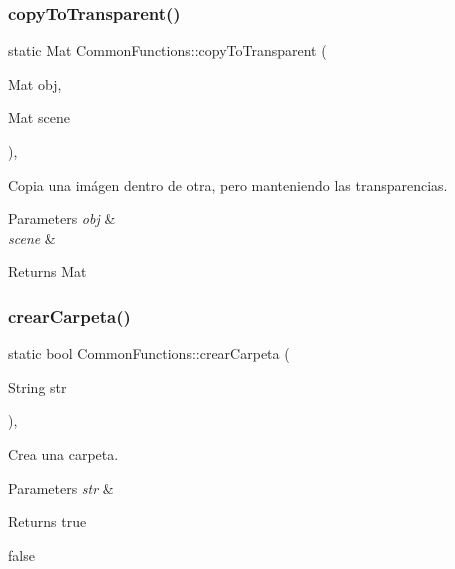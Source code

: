 \subsubsection{\texorpdfstring{copy\+To\+Transparent()}{copyToTransparent()}}
{\footnotesize\ttfamily static Mat Common\+Functions\+::copy\+To\+Transparent (\begin{DoxyParamCaption}\item[{Mat}]{obj,  }\item[{Mat}]{scene }\end{DoxyParamCaption})\hspace{0.3cm}{\ttfamily [inline]}, {\ttfamily [static]}}



Copia una imágen dentro de otra, pero manteniendo las transparencias. 


\begin{DoxyParams}{Parameters}
{\em obj} & \\
\hline
{\em scene} & \\
\hline
\end{DoxyParams}
\begin{DoxyReturn}{Returns}
Mat 
\end{DoxyReturn}
\mbox{\label{classCommonFunctions_acb8852ee747cb715a16e6dd9126d560d}} 
\subsubsection{\texorpdfstring{crear\+Carpeta()}{crearCarpeta()}}
{\footnotesize\ttfamily static bool Common\+Functions\+::crear\+Carpeta (\begin{DoxyParamCaption}\item[{String}]{str }\end{DoxyParamCaption})\hspace{0.3cm}{\ttfamily [inline]}, {\ttfamily [static]}}



Crea una carpeta. 


\begin{DoxyParams}{Parameters}
{\em str} & \\
\hline
\end{DoxyParams}
\begin{DoxyReturn}{Returns}
true 

false 
\end{DoxyReturn}
\mbox{\label{classCommonFunctions_a59211fa9ca611fd09496f4e376649ab2}} 
